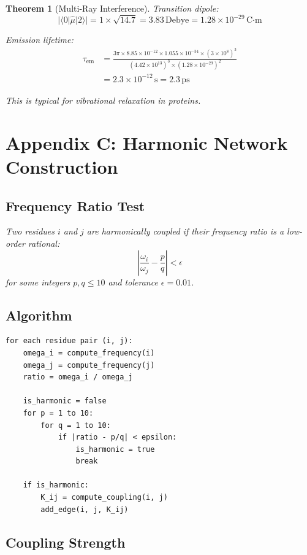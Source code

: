 \documentclass[11pt,a4paper]{article}
\newtheorem{theorem}{Theorem}[section]
\begin{document}
\begin{theorem}[Multi-Ray Interference]
Transition dipole:
\begin{equation}
|\langle 0|\hat{\mu}|2\rangle| = 1 \times \sqrt{14.7} = 3.83 \, \text{Debye} = 1.28 \times 10^{-29} \, \text{C·m}
\end{equation}

Emission lifetime:
\begin{align}
\tau_{\text{em}} &= \frac{3\pi \times 8.85 \times 10^{-12} \times 1.055 \times 10^{-34} \times (3 \times 10^8)^3}{(4.42 \times 10^{13})^3 \times (1.28 \times 10^{-29})^2} \\
&= 2.3 \times 10^{-12} \, \text{s} = 2.3 \, \text{ps}
\end{align}

This is typical for vibrational relaxation in proteins.

\section{Appendix C: Harmonic Network Construction}

\subsection{Frequency Ratio Test}

Two residues $i$ and $j$ are harmonically coupled if their frequency ratio is a low-order rational:
\begin{equation}
\left| \frac{\omega_i}{\omega_j} - \frac{p}{q} \right| < \epsilon
\end{equation}
for some integers $p, q \leq 10$ and tolerance $\epsilon = 0.01$.

\subsection{Algorithm}

\begin{verbatim}
for each residue pair (i, j):
    omega_i = compute_frequency(i)
    omega_j = compute_frequency(j)
    ratio = omega_i / omega_j
    
    is_harmonic = false
    for p = 1 to 10:
        for q = 1 to 10:
            if |ratio - p/q| < epsilon:
                is_harmonic = true
                break
    
    if is_harmonic:
        K_ij = compute_coupling(i, j)
        add_edge(i, j, K_ij)
\end{verbatim}

\subsection{Coupling Strength}


\end{theorem}
\end{document}
